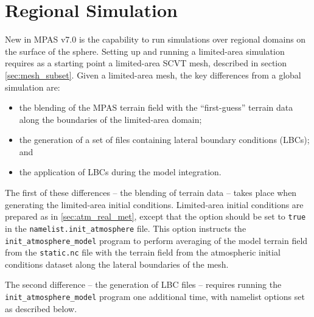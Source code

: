 \section{Regional Simulation}
\label{sec:regional}

New in MPAS v7.0 is the capability to run simulations over regional domains on the surface of the sphere. Setting up and running
a limited-area simulation requires as a starting point a limited-area SCVT mesh, described in section \ref{sec:mesh_subset}. Given
a limited-area mesh, the key differences from a global simulation are:

\begin{itemize}
\item the blending of the MPAS terrain field with the ``first-guess'' terrain data along the boundaries of the limited-area
domain;
\item the generation of a set of files containing lateral boundary conditions (LBCs); and
\item the application of LBCs during the model integration.
\end{itemize}

The first of these differences -- the blending of terrain data -- takes place when generating the limited-area initial conditions.
Limited-area initial conditions are prepared as in \ref{sec:atm_real_met}, except that the 
option should be set to {\tt true} in the {\tt namelist.init\_atmosphere} file. This option instructs the {\tt init\_atmosphere\_model}
program to perform averaging of the model terrain field from the {\tt static.nc} file with the terrain field from the atmospheric
initial conditions dataset along the lateral boundaries of the mesh.

The second difference -- the generation of LBC files -- requires running the {\tt init\_atmosphere\_model} program one additional
time, with namelist options set as described below.

